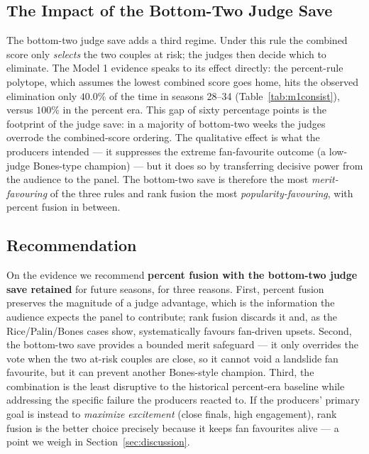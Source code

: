 \documentclass{article}
\begin{document}
\subsection{The Impact of the Bottom-Two Judge Save}

The bottom-two judge save adds a third regime. Under this rule the combined score only
\emph{selects} the two couples at risk; the judges then decide which to eliminate. The
Model 1 evidence speaks to its effect directly: the percent-rule polytope, which assumes the
lowest combined score goes home, hits the observed elimination only $\mathbf{40.0\%}$ of the
time in seasons 28--34 (Table~\ref{tab:m1consist}), versus $100\%$ in the percent era. This
gap of sixty percentage points is the footprint of the judge save: in a majority of
bottom-two weeks the judges overrode the combined-score ordering. The qualitative effect is
what the producers intended --- it suppresses the extreme fan-favourite outcome (a low-judge
Bones-type champion) --- but it does so by transferring decisive power from the audience to
the panel. The bottom-two save is therefore the most \emph{merit-favouring} of the three
rules and rank fusion the most \emph{popularity-favouring}, with percent fusion in between.

\subsection{Recommendation}

On the evidence we recommend \textbf{percent fusion with the bottom-two judge save retained}
for future seasons, for three reasons. First, percent fusion preserves the magnitude of a
judge advantage, which is the information the audience expects the panel to contribute;
rank fusion discards it and, as the Rice/Palin/Bones cases show, systematically favours
fan-driven upsets. Second, the bottom-two save provides a bounded merit safeguard --- it
only overrides the vote when the two at-risk couples are close, so it cannot void a
landslide fan favourite, but it can prevent another Bones-style champion. Third, the
combination is the least disruptive to the historical percent-era baseline while addressing
the specific failure the producers reacted to. If the producers' primary goal is instead to
\emph{maximize excitement} (close finals, high engagement), rank fusion is the better choice
precisely because it keeps fan favourites alive --- a point we weigh in
Section~\ref{sec:discussion}.


\end{document}
